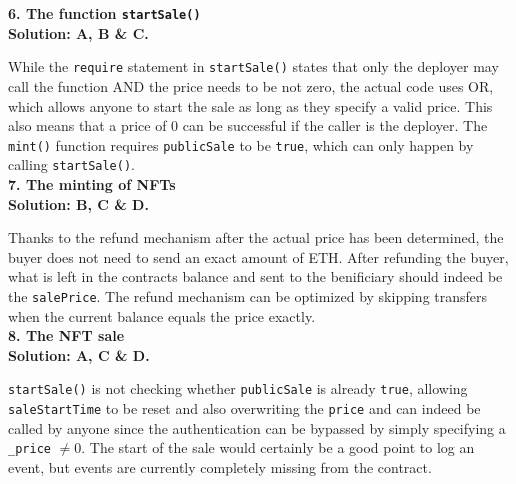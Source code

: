 \textbf{6. The function \texttt{startSale()}}\label{sec:exam8_q6}\\

\textbf{Solution: A, B \& C.}

While the \verb|require| statement in \verb|startSale()| states that only the deployer may call the function AND the price needs to be not zero, the actual code uses OR, which allows anyone to start the sale as long as they specify a valid price.
This also means that a price of 0 can be successful if the caller is the deployer.
The \verb|mint()| function requires \verb|publicSale| to be \verb|true|, which can only happen by calling \verb|startSale()|.\\

\textbf{7. The minting of NFTs}\label{sec:exam8_q7}\\

\textbf{Solution: B, C \& D.}

Thanks to the refund mechanism after the actual price has been determined, the buyer does not need to send an exact amount of ETH.
After refunding the buyer, what is left in the contracts balance and sent to the benificiary should indeed be the \verb|salePrice|.
The refund mechanism can be optimized by skipping transfers when the current balance equals the price exactly.\\

\textbf{8. The NFT sale}\label{sec:exam8_q8}\\

\textbf{Solution: A, C \& D.}

\verb|startSale()| is not checking whether \verb|publicSale| is already \verb|true|, allowing \verb|saleStartTime| to be reset and also overwriting the \verb|price| and can indeed be called by anyone since the authentication can be bypassed by simply specifying a \verb|_price| $\neq 0$.
The start of the sale would certainly be a good point to log an event, but events are currently completely missing from the contract.\\